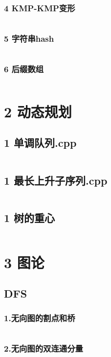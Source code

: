 \documentclass{article}
\begin{document}
\subsubsection{4 KMP-KMP变形}
\inputminted{c++}{/home/zzuzxy/t3/ACM-template/1 数据结构/字符串/4 KMP-KMP变形.cpp}
\subsubsection{5 字符串hash}
\inputminted{c++}{/home/zzuzxy/t3/ACM-template/1 数据结构/字符串/5 字符串hash.cpp}
\subsubsection{6 后缀数组}
\inputminted{c++}{/home/zzuzxy/t3/ACM-template/1 数据结构/字符串/6 后缀数组.cpp}
\section{2 动态规划}
\subsection{1 单调队列.cpp}
\inputminted{c++}{/home/zzuzxy/t3/ACM-template/2 动态规划/1 单调队列.cpp}
\subsection{1 最长上升子序列.cpp}
\inputminted{c++}{/home/zzuzxy/t3/ACM-template/2 动态规划/1 最长上升子序列.cpp}
\subsection{1 树的重心}
\inputminted{c++}{/home/zzuzxy/t3/ACM-template/2 动态规划/树上的分治/1 树的重心.cpp}
\section{3 图论}
\subsection{DFS}
\subsubsection{1.无向图的割点和桥}
\inputminted{c++}{/home/zzuzxy/t3/ACM-template/3 图论/DFS/1.无向图的割点和桥.cpp}
\subsubsection{2.无向图的双连通分量}
\inputminted{c++}{/home/zzuzxy/t3/ACM-template/3 图论/DFS/2.无向图的双连通分量.cpp}
\end{document}
